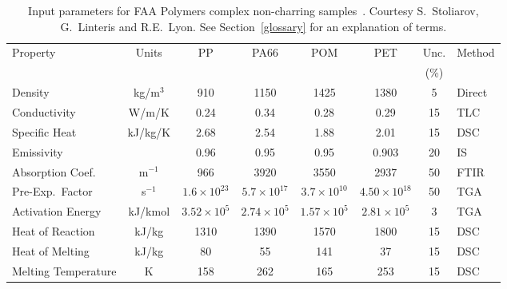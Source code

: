 \begin{table}[h!]
\caption[FAA complex non-charring polymer properties]{Input parameters for FAA Polymers complex non-charring samples~\cite{Stoliarov:FM2012}. Courtesy S.~Stoliarov, G.~Linteris and R.E.~Lyon. See Section~\ref{glossary} for an explanation of terms.}
\begin{center}
\begin{tabular}{|l|c|c|c|c|c|c|l|}
\hline
Property                    & Units         & PP                    & PA66                  & POM                   & PET                   & Unc.      & Method    \\
                            &               &                       &                       &                       &                       & (\%)      &           \\ \hline \hline
Density                     & kg/m$^3$      & 910                   & 1150                  & 1425                  & 1380                  & 5         & Direct    \\ \hline
Conductivity                & W/m/K         & 0.24                  & 0.34                  & 0.28                  & 0.29                  & 15        & TLC       \\ \hline
Specific Heat               & kJ/kg/K       & 2.68                  & 2.54                  & 1.88                  & 2.01                  & 15        & DSC       \\ \hline
Emissivity                  &               & 0.96                  & 0.95                  & 0.95                  & 0.903                 & 20        & IS        \\ \hline
Absorption Coef.            & m$^{-1}$      & 966                   & 3920                  & 3550                  & 2937                  & 50        & FTIR      \\ \hline
Pre-Exp.~Factor             & s$^{-1}$      & $1.6 \times 10^{23}$  & $5.7 \times 10^{17}$  & $3.7 \times 10^{10}$  & $4.50 \times 10^{18}$ & 50        & TGA       \\ \hline
Activation Energy           & kJ/kmol       & $3.52 \times 10^{5}$  & $2.74 \times 10^{5}$  & $1.57 \times 10^{5}$  & $2.81 \times 10^{5}$  & 3         & TGA       \\ \hline
Heat of Reaction            & kJ/kg         & 1310                  & 1390                  & 1570                  & 1800                  & 15        & DSC       \\ \hline
Heat of Melting             & kJ/kg         & 80                    & 55                    & 141                   & 37                    & 15        & DSC       \\ \hline
Melting Temperature         & K             & 158                   & 262                   & 165                   & 253                   & 15        & DSC       \\ \hline

\end{tabular}
\end{center}
\label{FAA_Properties2}
\end{table}



